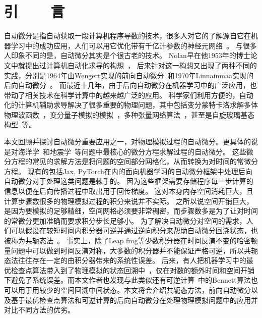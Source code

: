 \documentclass[A4,twoside,fontset=ubuntu,UTF8]{ctexart}
\begin{document}
\section{引~~~~言}
    自动微分是指自动获取一段计算机程序导数的技术，很多人对它的了解源自它在机器学习中的成功应用，人们可以用它优化带有千亿计参数的神经元网络~\cite{Rosset2019}。
与很多人印象不同的是，自动微分其实是个很古老的技术。
Nolan早在他1953年的博士论文中就提出过计算机自动化求导的构想~\cite{Nolan1953}，
后来针对这一构想又出现了两种不同的实践，分别是1964年由Wengert实现的前向自动微分~\cite{Wengert1964}和1970年Linnainmaa实现的后向自动微分~\cite{Linnainmaa1976}。
而最近十几年，由于后向自动微分在机器学习中的广泛应用，也带动了相关技术在科学计算中的越来越广泛的应用。
科学家们利用方便的，自动化的计算机辅助求导解决了很多重要的物理问题，其中包括变分蒙特卡洛求解多体物理波函数~\cite{Gutzwiller1963,Carleo2017, Deng2017,Cai2018}，变分量子模拟的模拟~\cite{Luo2019}，多种张量网络算法~\cite{Liao2019}，甚至是自旋玻璃基态构型~\cite{Liu2020}等。

本文回顾并探讨自动微分重要应用之一，对物理模拟过程的自动微分。更具体的说是对海洋学~\cite{Heimbach2005}和地震学~\cite{Symes2007,Zhu2020}等问题中最核心的微分方程求解过程的自动微分。
这些微分方程的常见的求解方法是将问题的空间部分网格化，从而转换为对时间的常微分方程。
现有的包括Jax, PyTorch在内的面向机器学习的自动微分框架中处理后向自动微分对于处理这类问题是棘手的。
因为这些框架需要存储程序每一步计算的信息以便在后向传播过程中取出用于回传梯度。
这对本身内存空间消耗巨大，且计算步骤数很多的物理模拟过程的积分来说并不实际。
之所以说空间开销巨大，是因为要模拟的足够精细，空间网格必须要非常稠密，而步骤数多是为了让对时间的常微分更加准确而要求积分步长足够小。
为了解决自动微分对空间的需求，人们可以假设在较短时间内积分器可逆并通过逆向积分来帮助自动微分回溯状态，也被称为共轭态法~\cite{Plessix2006,Chen2018}。
事实上，除了Leap frog等少数积分器在时间反演不变的哈密顿量问题中可以做到时间反演对称，大多数的积分器并不能保证严格可逆，所以共轭态法往往存在一定的由积分器带来的系统性误差。
后来，有人把机器学习中的最优检查点算法带入到了物理模拟的状态回溯中~\cite{Symes2007}，仅在对数的额外时间和空间开销下避免了系统误差。而本文作者也发现与此类似还有可逆计算~\cite{}中的Bennett算法也可以用于用较少的空间回溯中间状态。本文将会介绍共轭态方法，前向自动微分以及基于最优检查点算法和可逆计算的后向自动微分在处理物理模拟问题中的应用并对比不同方法的优劣。
\end{document}
